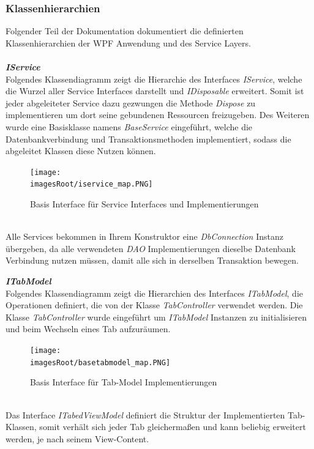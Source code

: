 \documentclass[11pt, a4paper, twoside]{article}   	%
\newcommand{\imagesRoot}{images}
\begin{document}
\newpage
\subsubsection{Klassenhierarchien}
Folgender Teil der Dokumentation dokumentiert die definierten Klassenhierarchien der WPF Anwendung und des Service Layers.\\\\

\emph{\textbf{IService}}\\
Folgendes Klassendiagramm zeigt die Hierarchie des Interfaces \emph{IService}, welche die Wurzel aller Service Interfaces darstellt und \emph{IDisposable} erweitert. Somit ist jeder abgeleiteter Service dazu gezwungen die Methode \emph{Dispose} zu implementieren um dort seine gebundenen Ressourcen freizugeben. Des Weiteren wurde eine Basisklasse namens \emph{BaseService} eingeführt, welche die Datenbankverbindung und Transaktionsmethoden implementiert, sodass die abgeleitet Klassen diese Nutzen können.
\begin{figure}[h]
	\centering
	\texttt{[image: \\imagesRoot/iservice\_map.PNG]}
	\caption
	{Basis Interface für Service Interfaces und Implementierungen}
\end{figure}
\ \\
Alle Services bekommen in Ihrem Konstruktor eine \emph{DbConnection} Instanz übergeben, da alle verwendeten \emph{DAO} Implementierungen dieselbe Datenbank Verbindung nutzen müssen, damit alle sich in derselben Transaktion bewegen.

\newpage
\textbf{\emph{ITabModel}}\\
Folgendes Klassendiagramm zeigt die Hierarchien des Interfaces \emph{ITabModel}, die Operationen definiert, die von der Klasse \emph{TabController} verwendet werden. Die Klasse \emph{TabController} wurde eingeführt um \emph{ITabModel} Instanzen zu initialisieren und beim Wechseln eines Tab aufzuräumen.
\begin{figure}[h]
	\centering
	\texttt{[image: \\imagesRoot/basetabmodel\_map.PNG]}
	\caption
	{Basis Interface für Tab-Model Implementierungen}
\end{figure}
\ \\
Das Interface \emph{ITabedViewModel} definiert die Struktur der Implementierten Tab-Klassen, somit verhält sich jeder Tab gleichermaßen und kann beliebig erweitert werden, je nach seinem View-Content.
\end{document}
